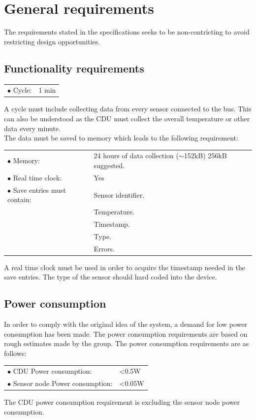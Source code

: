 \section{General requirements}
The requirements stated in the specifications seeks to be non-contricting to avoid restricting design opportunities.
\subsection{Functionality requirements}
\begin{table}[H]
\begin{tabular}{p{8cm} p{2cm}}
$\bullet$ Cycle: & 1 min\\
\end{tabular}
\end{table}
A cycle must include collecting data from every sensor connected to the bus. This can also be understood as the CDU must collect the overall temperature or other data every minute.\\
The data must be saved to memory which leads to the following requirement:
\begin{table}[H]
\begin{tabular}{p{8cm} p{5cm}}
$\bullet$ Memory: & 24 hours of data collection ($\sim$152kB) 256kB suggested.\\
$\bullet$ Real time clock: & Yes\\
$\bullet$ Save entries must contain: &Sensor identifier. \\
~ 									&Temperature. \\
~									&Timestamp. \\
~									&Type. \\
~									&Errors. \\
\end{tabular}
\end{table}
A real time clock must be used in order to acquire the timestamp needed in the save entries. The type of the sensor should hard coded into the device.
\subsection{Power consumption}
In order to comply with the original idea of the system, a demand for low power consumption has been made. The power consumption requirements are based on rough estimates made by the group. The power consumption requirements are as follows:
\begin{table}[H]
	\begin{tabular}{p{8cm} p{2cm}}
	$\bullet$ CDU Power consumption: & <0.5W\\
	$\bullet$ Sensor node Power consumption: & <0.05W\\
	\end{tabular}
\end{table}
The CDU power consumption requirement is excluding the sensor node power consumption.
